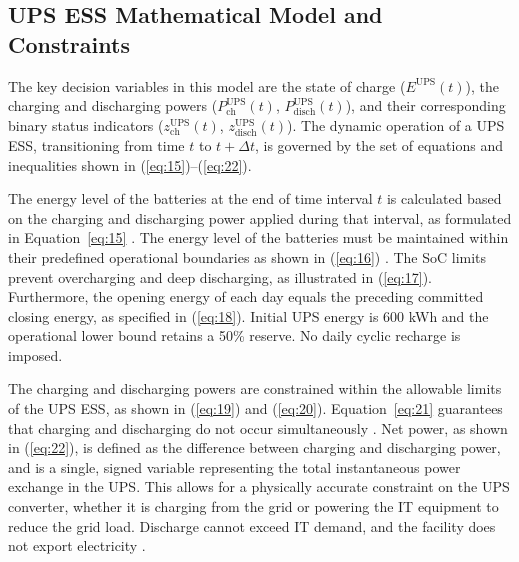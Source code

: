 \documentclass[lettersize,journal]{IEEEtran}
\begin{document}
\subsection{UPS ESS Mathematical Model and Constraints}\label{sec:ups-model}

 The key decision variables in this model are the state of charge ($E^{\mathrm{UPS}}(t)$), the charging and discharging powers ($P^{\mathrm{UPS}}_{\mathrm{ch}}(t)$, $P^{\mathrm{UPS}}_{\mathrm{disch}}(t)$), and their corresponding binary status indicators ($z^{\mathrm{UPS}}_{\mathrm{ch}}(t)$, $z^{\mathrm{UPS}}_{\mathrm{disch}}(t)$). The dynamic operation of a UPS ESS, transitioning from time \(t\) to \(t+\Delta t\), is governed by the set of equations and inequalities shown in (\ref{eq:15})--(\ref{eq:22}).

The energy level of the batteries at the end of time interval \(t\) is calculated based on the charging and discharging power applied during that interval, as formulated in Equation~\eqref{eq:15} \cite{Takci2024Chapter}.
The energy level of the batteries must be maintained within their predefined operational boundaries as shown in (\ref{eq:16}) \cite{Takci2024Chapter}. The SoC limits prevent overcharging and deep discharging, as illustrated in (\ref{eq:17}). Furthermore, the opening energy of each day equals the preceding committed closing energy, as specified in (\ref{eq:18}). Initial UPS energy is 600 kWh and the operational lower bound retains a 50\% reserve. No daily cyclic recharge is imposed.

The charging and discharging powers are constrained within the allowable limits of the UPS ESS, as shown in (\ref{eq:19}) and (\ref{eq:20}). Equation~\eqref{eq:21} guarantees that charging and discharging do not occur simultaneously \cite{Takci2024Chapter}. Net power, as shown in (\ref{eq:22}), is defined as the difference between charging and discharging power, and is a single, signed variable representing the total instantaneous power exchange in the UPS. This allows for a physically accurate constraint on the UPS converter, whether it is charging from the grid or powering the IT equipment to reduce the grid load. Discharge cannot exceed IT demand, and the facility does not export electricity \cite{Hashmi2024ArXiv}.
\end{document}
